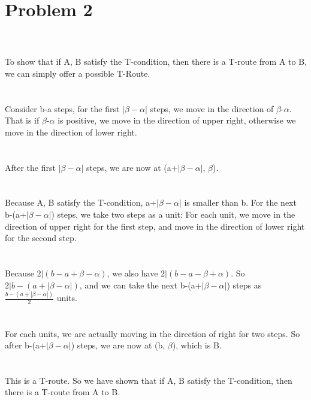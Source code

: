 \documentclass{article}
\begin{document}
\section{Problem 2}
\\ \hspace*{\fill} \\
To show that if A, B satisfy the T-condition, then there is a T-route from A to B, we can simply offer a possible T-Route.\\
\\ \hspace*{\fill} \\
Consider b-a steps, for the first $|\beta-\alpha|$ steps, we move in the direction of $\beta$-$\alpha$. That is if $\beta$-$\alpha$ is positive, we move in the direction of upper right, otherwise we move in the direction of lower right.\\
\\ \hspace*{\fill} \\
After the first $|\beta-\alpha|$ steps, we are now at (a+$|\beta-\alpha|$, $\beta$). \\
\\ \hspace*{\fill} \\
Because A, B satisfy the T-condition, a+$|\beta-\alpha|$ is smaller than b. For the next b-(a+$|\beta-\alpha|$) steps, we take two steps as a unit: For each unit, we move in the direction of upper right for the first step, and move in the direction of lower right for the second step.\\
\\ \hspace*{\fill} \\
Because $2|(b - a + \beta - \alpha)$, we also have $2|(b - a - \beta + \alpha)$. So $2|b-(a+|\beta-\alpha|)$, and we can take the next b-(a+$|\beta-\alpha|$) steps as $\frac{b-(a+|\beta-\alpha|)}{2}$ units.\\
\\ \hspace*{\fill} \\
For each units, we are actually moving in the direction of right for two steps. So after b-(a+$|\beta-\alpha|$) steps, we are now at (b, $\beta$), which is B.\\
\\ \hspace*{\fill} \\
This is a T-route. So we have shown that if A, B satisfy the T-condition, then there is a T-route from A to B.\\
\\ \hspace*{\fill} \\
\newpage
\end{document}
